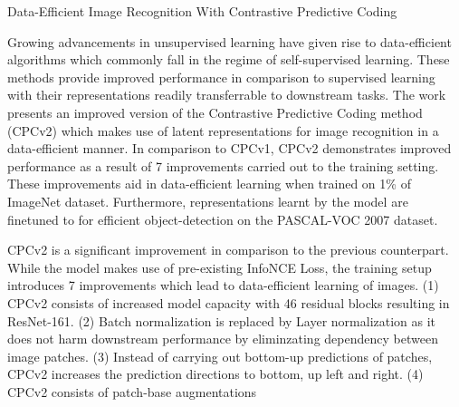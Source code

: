 \documentclass[11pt,letterpaper]{article}
\begin{document}
\begin{center}
  \large{Data-Efficient Image Recognition With Contrastive Predictive Coding}
\end{center}


Growing advancements in unsupervised learning have given rise to data-efficient algorithms which commonly fall in the regime of self-supervised learning. These methods provide improved performance in comparison to supervised learning with their representations readily transferrable to downstream tasks. The work presents an improved version of the Contrastive Predictive Coding method (CPCv2) which makes use of latent representations for image recognition in a data-efficient manner. In comparison to CPCv1, CPCv2 demonstrates improved performance as a result of 7 improvements carried out to the training setting. These improvements aid in data-efficient learning when trained on 1\% of ImageNet dataset. Furthermore, representations learnt by the model are finetuned to for efficient object-detection on the PASCAL-VOC 2007 dataset.

CPCv2 is a significant improvement in comparison to the previous counterpart. While the model makes use of pre-existing InfoNCE Loss, the training setup introduces 7 improvements which lead to data-efficient learning of images. (1) CPCv2 consists of increased model capacity with 46 residual blocks resulting in ResNet-161. (2) Batch normalization is replaced by Layer normalization as it does not harm downstream performance by eliminzating dependency between image patches. (3) Instead of carrying out bottom-up predictions of patches, CPCv2 increases the prediction directions to bottom, up left and right. (4) CPCv2 consists of patch-base augmentations 
\end{document}

